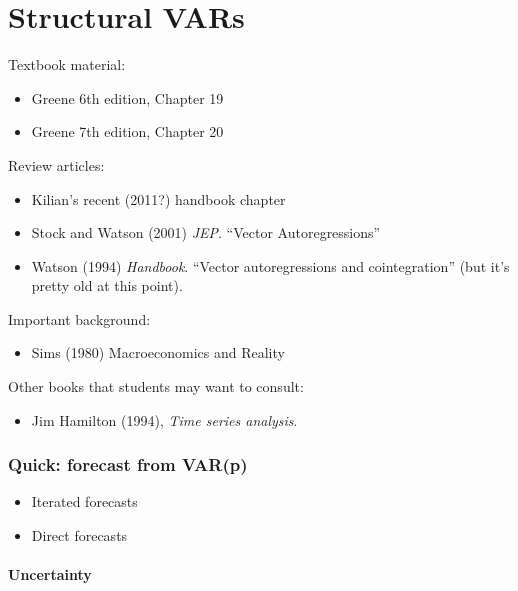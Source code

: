 % 

\part*{Structural VARs}

Textbook material:
\begin{itemize}
\item Greene 6th edition, Chapter 19
\item Greene 7th edition, Chapter 20
\end{itemize}
Review articles:
\begin{itemize}
\item Kilian's recent (2011?) handbook chapter
\item Stock and Watson (2001) \emph{JEP}. ``Vector Autoregressions''
\item Watson (1994) \emph{Handbook}. ``Vector autoregressions and
  cointegration'' (but it's pretty old at this point).
\end{itemize}
Important background:
\begin{itemize}
\item Sims (1980) Macroeconomics and Reality
\end{itemize}
Other books that students may want to consult:
\begin{itemize}
\item Jim Hamilton (1994), \emph{Time series analysis}.
\end{itemize}

\section{Quick: forecast from VAR(p)}

\begin{itemize}
\item Iterated forecasts
\item Direct forecasts
\end{itemize}

\subsection{Uncertainty}

